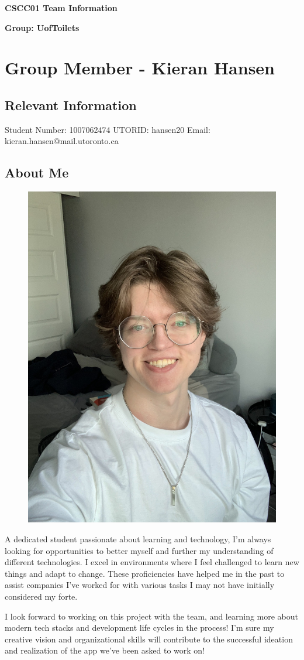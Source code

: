 \documentclass{article}
\begin{document}
\begin{center}{\Large\textbf{CSCC01 Team Information}}\end{center}
\begin{center}{\large{\textbf{Group: UofToilets}}}\end{center}

\section{Group Member - Kieran Hansen}
\subsection{Relevant Information}
    Student Number: 1007062474 \newline
    UTORID: hansen20 \newline
    Email: kieran.hansen@mail.utoronto.ca
\subsection{About Me}
\begin{figure}[h]
    \centering
    \includegraphics[width=0.25\linewidth]{images/KieranPhoto.jpg}
\end{figure}
A dedicated student passionate about learning and technology, I'm always looking for opportunities to better myself and further my understanding of different technologies. I excel in environments where I feel challenged to learn new things and adapt to change. These proficiencies have helped me in the past to assist companies I've worked for with various tasks I may not have initially considered my forte. \newline\par
I look forward to working on this project with the team, and learning more about modern tech stacks and development life cycles in the process! I'm sure my creative vision and organizational skills will contribute to the successful ideation and realization of the app we've been asked to work on!

\noindent\makebox[\linewidth]{\rule{\paperwidth}{0.4pt}}
\end{document}
